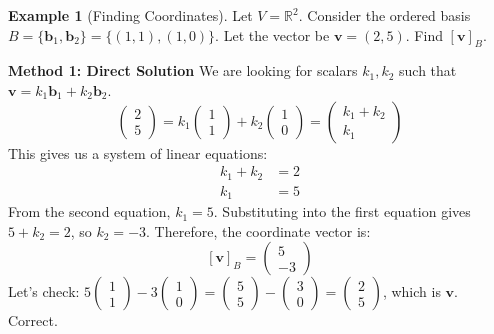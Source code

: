\documentclass[11pt]{article}
\theoremstyle{definition}
\newtheorem{example}[theorem]{Example}
\theoremstyle{remark}
\begin{document}
\begin{example}[Finding Coordinates]
Let $V = \mathbb{R}^2$. Consider the ordered basis $B = \{\mathbf{b}_1, \mathbf{b}_2\} = \{(1, 1), (1, 0)\}$. Let the vector be $\mathbf{v} = (2, 5)$. Find $[\mathbf{v}]_B$.

\textbf{Method 1: Direct Solution}
We are looking for scalars $k_1, k_2$ such that $\mathbf{v} = k_1 \mathbf{b}_1 + k_2 \mathbf{b}_2$.
\[ \begin{pmatrix} 2 \\ 5 \end{pmatrix} = k_1 \begin{pmatrix} 1 \\ 1 \end{pmatrix} + k_2 \begin{pmatrix} 1 \\ 0 \end{pmatrix} = \begin{pmatrix} k_1 + k_2 \\ k_1 \end{pmatrix} \]
This gives us a system of linear equations:
\begin{align*} k_1 + k_2 &= 2 \\ k_1 &= 5 \end{align*}
From the second equation, $k_1 = 5$. Substituting into the first equation gives $5 + k_2 = 2$, so $k_2 = -3$.
Therefore, the coordinate vector is:
\[ [\mathbf{v}]_B = \begin{pmatrix} 5 \\ -3 \end{pmatrix} \]
Let's check: $5 \begin{pmatrix} 1 \\ 1 \end{pmatrix} - 3 \begin{pmatrix} 1 \\ 0 \end{pmatrix} = \begin{pmatrix} 5 \\ 5 \end{pmatrix} - \begin{pmatrix} 3 \\ 0 \end{pmatrix} = \begin{pmatrix} 2 \\ 5 \end{pmatrix}$, which is $\mathbf{v}$. Correct.


\end{example}
\end{document}
